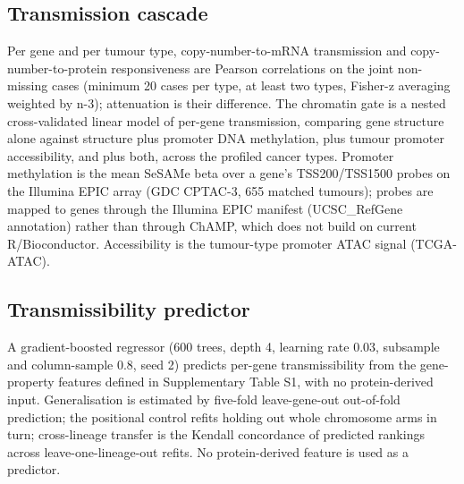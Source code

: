 \documentclass[times, twoside]{zHenriquesLab-StyleBioRxiv}
\begin{document}
\subsection*{Transmission cascade}
Per gene and per tumour type, copy-number-to-mRNA transmission and copy-number-to-protein responsiveness are Pearson correlations on the joint non-missing cases (minimum 20 cases per type, at least two types, Fisher-z averaging weighted by n-3); attenuation is their difference. The chromatin gate is a nested cross-validated linear model of per-gene transmission, comparing gene structure alone against structure plus promoter DNA methylation, plus tumour promoter accessibility, and plus both, across the profiled cancer types. Promoter methylation is the mean SeSAMe beta over a gene's TSS200/TSS1500 probes on the Illumina EPIC array (GDC CPTAC-3, 655 matched tumours); probes are mapped to genes through the Illumina EPIC manifest (UCSC\_RefGene annotation) rather than through ChAMP, which does not build on current R/Bioconductor. Accessibility is the tumour-type promoter ATAC signal (TCGA-ATAC).


\subsection*{Transmissibility predictor}
A gradient-boosted regressor\cite{ref27} (600 trees, depth 4, learning rate 0.03, subsample and column-sample 0.8, seed 2) predicts per-gene transmissibility from the gene-property features defined in Supplementary Table S1, with no protein-derived input. Generalisation is estimated by five-fold leave-gene-out out-of-fold prediction; the positional control refits holding out whole chromosome arms in turn; cross-lineage transfer is the Kendall concordance of predicted rankings across leave-one-lineage-out refits. No protein-derived feature is used as a predictor.
\end{document}
